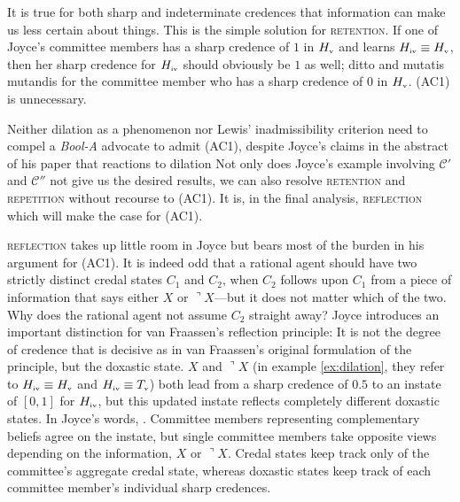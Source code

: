 \documentclass[11pt]{article}
\newcommand{\anderson}[0]{\textit{Bool-A}}
\begin{document}
It is true for both sharp and indeterminate credences that information
can make us less certain about things. This is the simple solution for
\textsc{retention}. If one of Joyce's committee members has a sharp
credence of $1$ in $H_{\mbox{\tiny{v}}}$ and learns
$H_{\mbox{\tiny{iv}}}\equiv{}H_{\mbox{\tiny{v}}}$, then her sharp
credence for $H_{\mbox{\tiny{iv}}}$ should obviously be $1$ as well;
ditto and mutatis mutandis for the committee member who has a sharp
credence of $0$ in $H_{\mbox{\tiny{v}}}$. (AC1) is unnecessary.

Neither dilation as a phenomenon nor Lewis' inadmissibility criterion
need to compel a {\anderson} advocate to admit (AC1), despite Joyce's
claims in the abstract of his paper that reactions to dilation
 Not only does Joyce's example
involving $\mathcal{C}'$ and $\mathcal{C}''$ not give us the desired
results, we can also resolve \textsc{retention} and
\textsc{repetition} without recourse to (AC1). It is, in the final
analysis, \textsc{reflection} which will make the case for (AC1).

\textsc{reflection} takes up little room in Joyce but bears most of
the burden in his argument for (AC1). It is indeed odd that a rational
agent should have two strictly distinct credal states $C_{1}$ and
$C_{2}$, when $C_{2}$ follows upon $C_{1}$ from a piece of information
that says either $X$ or $\urcorner{}X$---but it does not matter which
of the two. Why does the rational agent not assume $C_{2}$ straight
away? Joyce introduces an important distinction for van Fraassen's
reflection principle: It is not the degree of credence that is
decisive as in van Fraassen's original formulation of the principle,
but the doxastic state. $X$ and $\urcorner{}X$ (in example
\ref{ex:dilation}, they refer to
$H_{\mbox{\tiny{iv}}}\equiv{}H_{\mbox{\tiny{v}}}$ and
$H_{\mbox{\tiny{iv}}}\equiv{}T_{\mbox{\tiny{v}}}$) both lead from a
sharp credence of $0.5$ to an instate of $[0,1]$ for
$H_{\mbox{\tiny{iv}}}$, but this updated instate reflects completely
different doxastic states. In Joyce's words, 
. Committee members representing complementary
beliefs agree on the instate, but single committee members take
opposite views depending on the information, $X$ or $\urcorner{}X$.
Credal states keep track only of the committee's aggregate credal
state, whereas doxastic states keep track of each committee member's
individual sharp credences.
\end{document}
